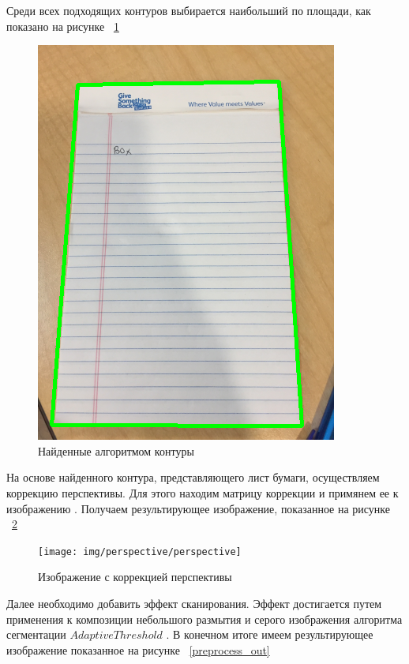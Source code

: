 Среди всех подходящих контуров выбирается наибольший по площади, как показано на рисунке ~\ref{contours}
\begin{figure}
    \includegraphics[scale=0.5]{img/perspective/contours}
    \caption{Найденные алгоритмом контуры}
    \label{contours}
\end{figure}


На основе найденного контура, представляющего лист бумаги, осуществляем коррекцию перспективы. Для этого находим матрицу коррекции \cite{opencv_perspective_transform} и примянем ее к изображению \cite{opencv_warp_perspective}.
Получаем результирующее изображение, показанное на рисунке ~\ref{perspective_correction}
\begin{figure}
    \texttt{[image: img/perspective/perspective]}
    \caption{Изображение с коррекцией перспективы}
    \label{perspective_correction}
\end{figure}

Далее необходимо добавить эффект сканирования. Эффект достигается путем применения к композиции небольшого размытия и серого изображения алгоритма сегментации $Adaptive Threshold$ \cite{opencv_threshold}. 
В конечном итоге имеем результирующее изображение показанное на рисунке ~\ref{preprocess_out}

